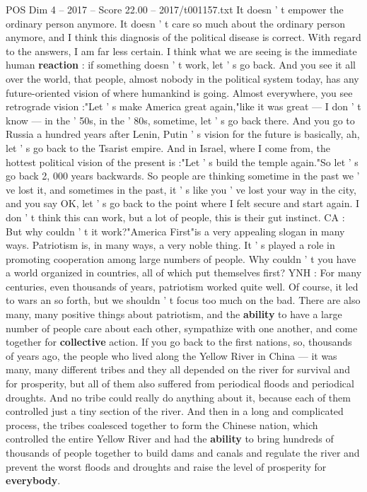 \begin{textsample}{POS Dim 4 – 2017 – Score 22.00 – 2017/t001157.txt}
It doesn ' t empower the ordinary person anymore.
It doesn ' t care so much about the ordinary person anymore, and I think this diagnosis of the political disease is correct.
With regard to the answers, I am far less certain.
I think what we are seeing is the immediate human \textbf{reaction} : if something doesn ' t work, let ' s go back.
And you see it all over the world, that people, almost nobody in the political system today, has any future-oriented vision of where humankind is going.
Almost everywhere, you see retrograde vision :"Let ' s make America great again,"like it was great — I don ' t know — in the ' 50s, in the ' 80s, sometime, let ' s go back there.
And you go to Russia a hundred years after Lenin, Putin ' s vision for the future is basically, ah, let ' s go back to the Tsarist empire.
And in Israel, where I come from, the hottest political vision of the present is :"Let ' s build the temple again."So let ' s go back 2, 000 years backwards.
So people are thinking sometime in the past we ' ve lost it, and sometimes in the past, it ' s like you ' ve lost your way in the city, and you say OK, let ' s go back to the point where I felt secure and start again.
I don ' t think this can work, but a lot of people, this is their gut instinct.
CA : But why couldn ' t it work?"America First"is a very appealing slogan in many ways.
Patriotism is, in many ways, a very noble thing.
It ' s played a role in promoting cooperation among large numbers of people.
Why couldn ' t you have a world organized in countries, all of which put themselves first?
YNH : For many centuries, even thousands of years, patriotism worked quite well.
Of course, it led to wars an so forth, but we shouldn ' t focus too much on the bad.
There are also many, many positive things about patriotism, and the \textbf{ability} to have a large number of people care about each other, sympathize with one another, and come together for \textbf{collective} action.
If you go back to the first nations, so, thousands of years ago, the people who lived along the Yellow River in China — it was many, many different tribes and they all depended on the river for survival and for prosperity, but all of them also suffered from periodical floods and periodical droughts.
And no tribe could really do anything about it, because each of them controlled just a tiny section of the river.
And then in a long and complicated process, the tribes coalesced together to form the Chinese nation, which controlled the entire Yellow River and had the \textbf{ability} to bring hundreds of thousands of people together to build dams and canals and regulate the river and prevent the worst floods and droughts and raise the level of prosperity for \textbf{everybody}.

\end{textsample}
